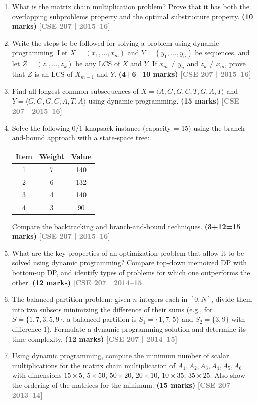 \documentclass[12pt,a3paper]{article}
\newcommand{\yr}[1]{\hfill\textcolor{gray}{\small\textbf{[#1]}}}
\newcommand{\mk}[1]{\textcolor{orange!70!black}{\small\textbf{(#1 marks)}}}
\begin{document}
\begin{enumerate}
\item What is the matrix chain multiplication problem? Prove that it has both the overlapping subproblems property and the optimal substructure property. \mk{10}
\yr{CSE 207 | 2015--16}

\item Write the steps to be followed for solving a problem using dynamic programming. Let $X = (x_1, \ldots, x_m)$ and $Y = (y_1, \ldots, y_n)$ be sequences, and let $Z = (z_1, \ldots, z_k)$ be any LCS of $X$ and $Y$. If $x_m \neq y_n$ and $z_k \neq x_m$, prove that $Z$ is an LCS of $X_{m-1}$ and $Y$. \mk{4+6=10}
\yr{CSE 207 | 2015--16}

\item Find all longest common subsequences of $X = \langle A,G,G,C,T,G,A,T \rangle$ and $Y = \langle G,G,G,C,A,T,A \rangle$ using dynamic programming. \mk{15}
\yr{CSE 207 | 2015--16}

\item Solve the following 0/1 knapsack instance (capacity = 15) using the branch-and-bound approach with a state-space tree:
\begin{center}
\begin{tabular}{ccc}
\toprule
Item & Weight & Value \\
\midrule
1 & 7 & 140 \\
2 & 6 & 132 \\
3 & 4 & 140 \\
4 & 3 & 90 \\
\bottomrule
\end{tabular}
\end{center}
Compare the backtracking and branch-and-bound techniques. \mk{3+12=15}
\yr{CSE 207 | 2015--16}

\item What are the key properties of an optimization problem that allow it to be solved using dynamic programming? Compare top-down memoized DP with bottom-up DP, and identify types of problems for which one outperforms the other. \mk{12}
\yr{CSE 207 | 2014--15}

\item The balanced partition problem: given $n$ integers each in $[0, N]$, divide them into two subsets minimizing the difference of their sums (e.g., for $S = \{1,7,3,5,9\}$, a balanced partition is $S_1 = \{1,7,5\}$ and $S_2 = \{3,9\}$ with difference 1). Formulate a dynamic programming solution and determine its time complexity. \mk{12}
\yr{CSE 207 | 2014--15}

\item Using dynamic programming, compute the minimum number of scalar multiplications for the matrix chain multiplication of $A_1, A_2, A_3, A_4, A_5, A_6$ with dimensions $15\times5$, $5\times50$, $50\times20$, $20\times10$, $10\times35$, $35\times25$. Also show the ordering of the matrices for the minimum. \mk{15}
\yr{CSE 207 | 2013--14}


\end{enumerate}
\end{document}
